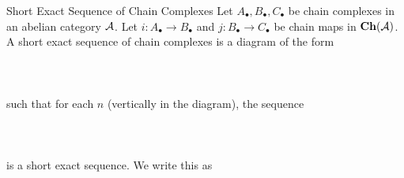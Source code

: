 \documentclass[a4paper]{article}
\begin{document}
\begin{defn}{Short Exact Sequence of Chain Complexes}{} Let $A_\bullet,B_\bullet,C_\bullet$ be chain complexes in an abelian category $\mathcal{A}$. Let $i:A_\bullet\to B_\bullet$ and $j:B_\bullet\to C_\bullet$ be chain maps in $\bold{Ch}(\mathcal{A})$. A short exact sequence of chain complexes is a diagram of the form \\~\\
\\~\\
such that for each $n$ (vertically in the diagram), the sequence \\~\\
\\~\\ is a short exact sequence. We write this as \\~\\
\end{defn}
\end{document}
